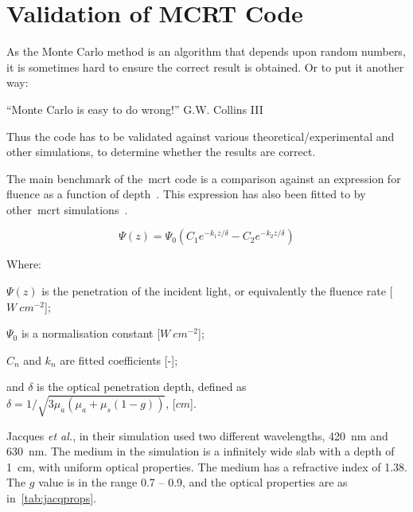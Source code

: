 \FloatBarrier
\section{Validation of MCRT Code}\label{sec:validation}

As the Monte Carlo method is an algorithm that depends upon random numbers, it is sometimes hard to ensure the correct result is obtained.
Or to put it another way:
\medskip

``Monte Carlo is easy to do wrong!'' G.W. Collins III~\cite{bjormaneasymonte}

\medskip

Thus the code has to be validated against various theoretical/experimental and other simulations, to determine whether the results are correct.

The main benchmark of the~\gls*{mcrt} code is a comparison against an expression for fluence as a function of depth~\cite{gardner1993fluorescence}.
This expression has also been fitted to by other~\gls*{mcrt} simulations~\cite{jacques1993photobleaching}.

\begin{equation}
\Psi(z)=\Psi_0(C_1e^{-k_1z/\delta}-C_2e^{-k_2z/\delta})
\label{eqn:jacqmatch}
\end{equation}

\noindent Where:

\indent $\Psi(z)$ is the penetration of the incident light, or equivalently the fluence rate [$W\ cm^{-2}$];

\indent $\Psi_0$ is a normalisation constant [$W\ cm^{-2}$];

\indent $C_n$ and $k_n$ are fitted coefficients [-];

\indent and $\delta$ is the optical penetration depth, defined as $\delta=1/\sqrt{3\mu_a(\mu_a+\mu_s(1-g))}$, [$cm$].

\medskip

Jacques \textit{et al.}, in their simulation used two different wavelengths, 420~nm and 630~nm.
The medium in the simulation is a infinitely wide slab with a depth of 1~cm, with uniform optical properties. 
The medium has a refractive index of 1.38.
The $g$ value is in the range 0.7 -- 0.9, and the optical properties are as in~\cref{tab:jacqprops}.

